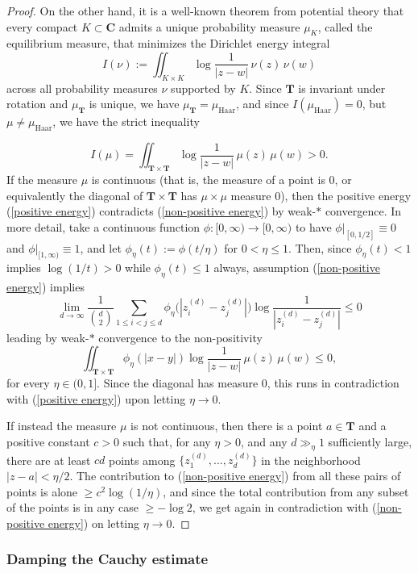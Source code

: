 \documentclass[10pt]{amsart}
\def\T{\mathbf{T}}
\theoremstyle{remark}
\numberwithin{equation}{subsection}
\def\numequation{\addtocounter{subsubsection}{1}\begin{equation}}
\def\C{\mathbf{C}}
\begin{document}
\begin{proof}
On the other hand, it is a well-known theorem from potential theory that every compact $K \subset \C$ admits a unique probability measure $\mu_K$, called the equilibrium measure, that minimizes the Dirichlet energy integral
$$
I(\nu) :=  \iint_{K \times K} \log{ \frac{1}{|z-w|} } \, \nu(z) \, \nu(w) 
$$
across all probability measures $\nu$ supported by $K$. Since $\T$ is invariant under rotation and $\mu_{\T}$ is unique, we have $\mu_{\T} = \mu_{\mathrm{Haar}}$, and since $I(\mu_{\mathrm{Haar}}) = 0$, but $\mu \neq \mu_{\mathrm{Haar}}$, we have the strict inequality
\numequation \label{positive energy}
I(\mu) =  \iint_{\T \times \T} \log{ \frac{1}{|z-w|} } \, \mu(z) \, \mu(w)  > 0. 
\end{equation}
If the measure $\mu$ is continuous (that is, the measure of a point is $0$, or equivalently the diagonal of $\T \times \T$ has $\mu \times \mu$ measure $0$), then the positive energy (\ref{positive energy}) contradicts (\ref{non-positive energy}) by 
weak-$*$ convergence.  In more detail, take a continuous function $\phi : [0, \infty) \to [0,\infty)$ to have
$\phi|_{[0,1/2]} \equiv 0$ and $\phi|_{[1,\infty)} \equiv  1$, and let $\phi_{\eta}(t) := \phi(t /\eta)$ for $0 < \eta \leq 1$. 
Then, since $\phi_{\eta}(t) < 1$ implies $\log{(1/t)} > 0$ while $\phi_{\eta}(t) \leq 1$ always, assumption
(\ref{non-positive energy}) implies
$$
\lim_{d \to \infty} \frac{1}{\binom{d}{2}} \sum_{1 \leq i < j \leq d} \phi_{\eta}\big( |z_i^{(d)}-z_j^{(d)}| \big) \log{\frac{1}{|z_i^{(d)}-z_j^{(d)}|}} \leq 0
$$
leading by weak-$*$ convergence to the non-positivity
$$
 \iint_{\T \times \T} \phi_{\eta}(|x-y|) \log{ \frac{1}{|z-w|} } \, \mu(z) \, \mu(w) \leq 0, 
$$
for every $\eta \in (0,1]$. Since the diagonal has measure $0$,  this runs in contradiction with (\ref{positive energy}) upon letting $\eta \to 0$. 


If instead the measure $\mu$ is not continuous, then there is a point $a \in \T$ and a positive constant $c > 0$ such that, for any $\eta > 0$, and any $d \gg_{\eta} 1$ sufficiently large, there are 
at least $cd$ points among $\{  z_1^{(d)}, \ldots, z_d^{(d)} \}$ in the neighborhood $|z - a| < \eta / 2$. The contribution to (\ref{non-positive energy}) from all these pairs of points 
is alone $\geq c^2 \log(1/\eta)$, and since the total contribution from any subset of the points is in any case $\geq -\log{2}$, we get again in contradiction with (\ref{non-positive energy}) on letting 
$\eta \to 0$.
\end{proof}


\subsubsection{Damping the Cauchy estimate} \label{damping}
\end{document}

